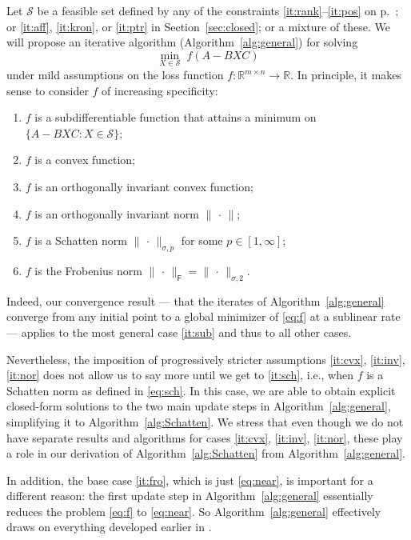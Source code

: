 \documentclass[11pt,reqno]{amsart}
\newcommand{\st}{\sigma}
\newcommand{\F}{{\scriptscriptstyle\mathsf{F}}}
\theoremstyle{definition}
\numberwithin{equation}{section}
\newcommand{\R}{\mathbb{R}}
\begin{document}
Let $\mathcal{S}$ be a feasible set defined by any of the constraints \ref{it:rank}--\ref{it:pos} on p.~\pageref{it:rank}; or \ref{it:aff}, \ref{it:kron}, or \ref{it:ptr} in Section~\ref{sec:closed}; or a mixture of these. We will propose an iterative algorithm (Algorithm~\ref{alg:general}) for solving
\begin{equation}\label{eq:f}
\min_{X \in \mathcal{S}} \; f(A-BXC)
\end{equation}
under mild assumptions on the loss function  $f: \R^{m\times n} \to \R$. In principle, it makes sense to consider $f$ of increasing specificity:
\begin{enumerate}[\upshape (a)]
\item $f$ is a subdifferentiable function that attains a minimum on $\{A - BXC : X \in \mathcal{S}\}$; \label{it:sub}
\item $f$ is a convex function; \label{it:cvx}
\item $f$ is an orthogonally invariant convex function; \label{it:inv}
\item $f$ is an orthogonally invariant norm  $\lVert \, \cdot \, \rVert$; \label{it:nor}
\item $f$ is a Schatten norm $\lVert \, \cdot \, \rVert_{\st,p}$ for some $p \in [1,\infty]$; \label{it:sch}
\item $f$ is the Frobenius norm  $\lVert \, \cdot \, \rVert_\F = \lVert \, \cdot \, \rVert_{\st,2}$. \label{it:fro}
\end{enumerate}
Indeed, our convergence result --- that the iterates of Algorithm~\ref{alg:general} converge from any initial point to a global minimizer of \eqref{eq:f} at a sublinear rate --- applies to the most general case \ref{it:sub} and thus to all other cases. 

Nevertheless, the imposition of progressively stricter assumptions \ref{it:cvx}, \ref{it:inv}, \ref{it:nor} does not allow us to say more until we get to \ref{it:sch}, i.e., when $f$ is a Schatten norm as defined in \eqref{eq:sch}. In this case, we are able to obtain explicit closed-form solutions to the two main update steps in Algorithm~\ref{alg:general}, simplifying it to Algorithm~\ref{alg:Schatten}.  We stress that even though we do not have separate results and algorithms for cases \ref{it:cvx}, \ref{it:inv}, \ref{it:nor}, these play a role in our derivation of Algorithm~\ref{alg:Schatten} from Algorithm~\ref{alg:general}.

In addition, the base case \ref{it:fro}, which is just \eqref{eq:near}, is important for a different reason: the first update step in Algorithm~\ref{alg:general} essentially reduces the problem \eqref{eq:f} to \eqref{eq:near}. So Algorithm~\ref{alg:general} effectively draws on everything developed earlier in \cite{li22}.
\end{document}
